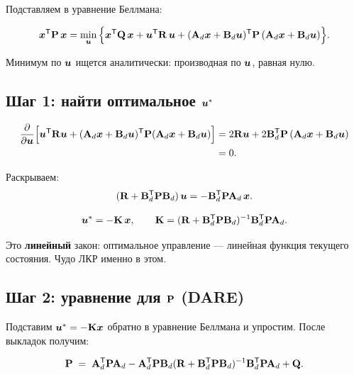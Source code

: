 Подставляем в уравнение Беллмана:

\[
  \bm{x}^{\mathsf{T}} \mathbf{P}\,\bm{x}
  = \min_{\bm{u}}
    \Big\{\bm{x}^{\mathsf{T}} \mathbf{Q}\,\bm{x} + \bm{u}^{\mathsf{T}} \mathbf{R}\,\bm{u}
          + (\mathbf{A}_d\bm{x} + \mathbf{B}_d\bm{u})^{\mathsf{T}} \mathbf{P}\,
            (\mathbf{A}_d\bm{x} + \mathbf{B}_d\bm{u})\Big\}.
\]

Минимум по $\bm{u}$ ищется аналитически: производная по $\bm{u}$,
равная нулю.

\subsection{Шаг 1: найти оптимальное \texorpdfstring{$\bm{u}^*$}{u*}}

\begin{align*}
  \frac{\partial}{\partial \bm{u}}\Big[
    \bm{u}^{\mathsf{T}} \mathbf{R}\bm{u} + (\mathbf{A}_d\bm{x} + \mathbf{B}_d\bm{u})^{\mathsf{T}}
    \mathbf{P}(\mathbf{A}_d\bm{x} + \mathbf{B}_d\bm{u})
  \Big]
  &= 2\mathbf{R}\bm{u} + 2\mathbf{B}_d^{\mathsf{T}} \mathbf{P}\,(\mathbf{A}_d\bm{x} + \mathbf{B}_d\bm{u})\\
  &= 0.
\end{align*}

Раскрываем:
\[
  (\mathbf{R} + \mathbf{B}_d^{\mathsf{T}} \mathbf{P}\mathbf{B}_d)\,\bm{u} =
    -\mathbf{B}_d^{\mathsf{T}} \mathbf{P}\mathbf{A}_d\,\bm{x}.
\]

\begin{formulabox}[title={Оптимальное управление через $\mat{P}$}]
\begin{equation}
  \bm{u}^* = -\mathbf{K}\,\bm{x},
  \qquad
  \mathbf{K} = (\mathbf{R} + \mathbf{B}_d^{\mathsf{T}} \mathbf{P}\mathbf{B}_d)^{-1} \mathbf{B}_d^{\mathsf{T}} \mathbf{P}\mathbf{A}_d.
  \label{eq:lqr_gain}
\end{equation}
\end{formulabox}

Это \textbf{линейный} закон: оптимальное управление --- линейная функция
текущего состояния. Чудо ЛКР именно в этом.

\subsection{Шаг 2: уравнение для $\mat{P}$ (DARE)}

Подставим $\bm{u}^* = -\mathbf{K}\bm{x}$ обратно в уравнение Беллмана
и упростим. После выкладок получим:

\begin{formulabox}[title={DARE --- Discrete Algebraic Riccati Equation}]
\begin{equation}
  \mathbf{P} \;=\; \mathbf{A}_d^{\mathsf{T}} \mathbf{P}\mathbf{A}_d
              - \mathbf{A}_d^{\mathsf{T}} \mathbf{P}\mathbf{B}_d
                (\mathbf{R} + \mathbf{B}_d^{\mathsf{T}} \mathbf{P}\mathbf{B}_d)^{-1}
                \mathbf{B}_d^{\mathsf{T}} \mathbf{P}\mathbf{A}_d
              + \mathbf{Q}.
  \label{eq:dare}
\end{equation}
\end{formulabox}

